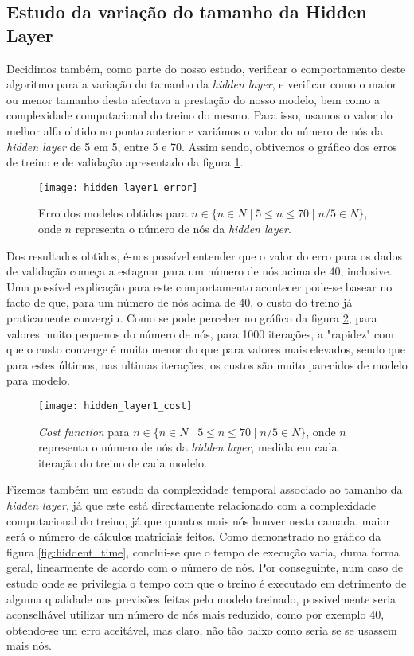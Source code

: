 \subsection{Estudo da variação do tamanho da Hidden Layer}
Decidimos também, como parte do nosso estudo, verificar o comportamento deste algoritmo para a variação do tamanho da \textit{hidden layer}, e verificar como o maior ou menor tamanho desta afectava a prestação do nosso modelo, bem como a complexidade computacional do treino do mesmo. Para isso, usamos o valor do melhor alfa obtido no ponto anterior e variámos o valor do número de nós da \textit{hidden layer} de 5 em 5, entre 5 e 70. Assim sendo, obtivemos o gráfico dos erros de treino e de validação apresentado da figura \ref{fig:hiddent_error}.

\begin{figure}[!b]
\centering
\texttt{[image: hidden\_layer1\_error]}
\caption{Erro dos modelos obtidos para $n \in \{ n \in \!N \mid 5  \leq n \leq 70 \mid n / 5 \in \!N \}$, onde $n$ representa o número de nós da \textit{hidden layer}.}
\label{fig:hiddent_error}
\end{figure}
Dos resultados obtidos, é-nos possível entender que o valor do erro para os dados de validação começa a estagnar para um número de nós acima de 40, inclusive. Uma possível explicação para este comportamento acontecer pode-se basear no facto de que, para um número de nós acima de 40, o custo do treino já praticamente convergiu. Como se pode perceber no gráfico da figura \ref{fig:hiddent_cost}, para valores muito pequenos do número de nós, para 1000 iterações, a "rapidez" com que o custo converge é muito menor do que para valores mais elevados, sendo que para estes últimos, nas ultimas iterações, os custos são muito parecidos de modelo para modelo.
\begin{figure}[!t]
\centering
\texttt{[image: hidden\_layer1\_cost]}
\caption{\textit{Cost function} para $n \in \{ n \in \!N \mid 5  \leq n \leq 70 \mid n / 5 \in \!N \}$, onde $n$ representa o número de nós da \textit{hidden layer}, medida em cada iteração do treino de cada modelo.}
\label{fig:hiddent_cost}
\end{figure}
Fizemos também um estudo da complexidade temporal associado ao tamanho da \textit{hidden layer}, já que este está directamente relacionado com a complexidade computacional do treino, já que quantos mais nós houver nesta camada, maior será o número de cálculos matriciais feitos. Como demonstrado no gráfico da figura \ref{fig:hiddent_time}, conclui-se que o tempo de execução varia, duma forma geral, linearmente de acordo com o número de nós. Por conseguinte, num caso de estudo onde se privilegia o tempo com que o treino é executado em detrimento de alguma qualidade nas previsões feitas pelo modelo treinado, possivelmente seria aconselhável utilizar um número de nós mais reduzido, como por exemplo 40, obtendo-se um erro aceitável, mas claro, não tão baixo como seria se se usassem mais nós.

